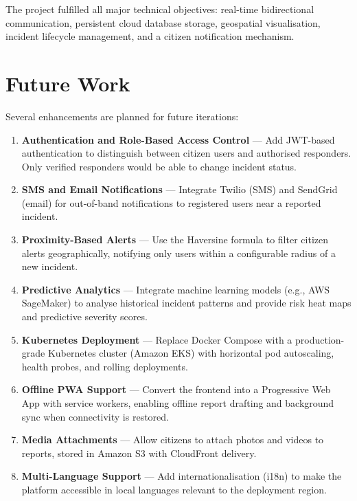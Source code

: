 \documentclass[12pt, a4paper]{report}
\begin{document}
The project fulfilled all major technical objectives: real-time bidirectional communication, persistent cloud database storage, geospatial visualisation, incident lifecycle management, and a citizen notification mechanism.

\section{Future Work}

Several enhancements are planned for future iterations:

\begin{enumerate}
  \item \textbf{Authentication and Role-Based Access Control} --- Add JWT-based authentication to distinguish between citizen users and authorised responders. Only verified responders would be able to change incident status.

  \item \textbf{SMS and Email Notifications} --- Integrate Twilio (SMS) and SendGrid (email) for out-of-band notifications to registered users near a reported incident.

  \item \textbf{Proximity-Based Alerts} --- Use the Haversine formula to filter citizen alerts geographically, notifying only users within a configurable radius of a new incident.

  \item \textbf{Predictive Analytics} --- Integrate machine learning models (e.g., AWS SageMaker) to analyse historical incident patterns and provide risk heat maps and predictive severity scores.

  \item \textbf{Kubernetes Deployment} --- Replace Docker Compose with a production-grade Kubernetes cluster (Amazon EKS) with horizontal pod autoscaling, health probes, and rolling deployments.

  \item \textbf{Offline PWA Support} --- Convert the frontend into a Progressive Web App with service workers, enabling offline report drafting and background sync when connectivity is restored.

  \item \textbf{Media Attachments} --- Allow citizens to attach photos and videos to reports, stored in Amazon S3 with CloudFront delivery.

  \item \textbf{Multi-Language Support} --- Add internationalisation (i18n) to make the platform accessible in local languages relevant to the deployment region.
\end{enumerate}
\end{document}
